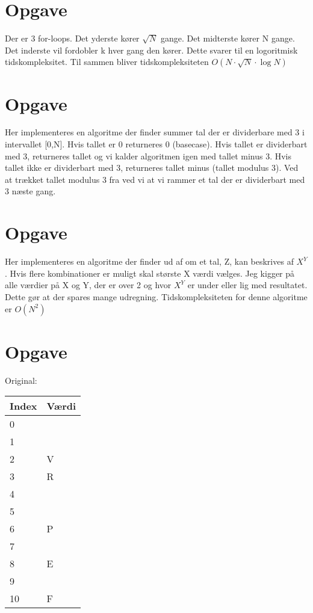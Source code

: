 \documentclass{article}
\begin{document}
\section{Opgave} %
Der er 3 for-loops. Det yderste kører $\sqrt{N}$ gange.
Det midterste kører N gange.
Det inderste vil fordobler k hver gang den kører. Dette svarer til
en logoritmisk tidskompleksitet.
Til sammen bliver tidskompleksiteten $O(N\cdot\sqrt{N}\cdot \log{N})$

\section{Opgave} %
Her implementeres en algoritme der finder summer tal der er dividerbare med 3
i intervallet [0,N].
Hvis tallet er 0 returneres 0 (basecase).
Hvis tallet er dividerbart med 3, returneres tallet og vi kalder algoritmen igen
med tallet minus 3. 
Hvis tallet ikke er dividerbart med 3, returneres tallet minus (tallet modulus 3).
Ved at trækket tallet modulus 3 fra ved vi at vi rammer et tal der er dividerbart
med 3 næste gang.

\section{Opgave} %
Her implementeres en algoritme der finder ud af om et tal, Z, kan beskrives af $X^Y$. 
Hvis flere kombinationer er muligt skal største X værdi vælges.
Jeg kigger på alle værdier på X og Y, der er over 2 og hvor $X^Y$ er under eller lig
med resultatet. Dette gør at der spares mange udregning. Tidskompleksiteten for 
denne algoritme er $O(N^2)$

\section{Opgave} %
Original:
\begin{table}[H]
\centering
\begin{tabular}{|l|l|}
\hline
\rowcolor[HTML]{C0C0C0} 
Index & Værdi \\ \hline
0     &       \\ \hline
1     &       \\ \hline
2     & V     \\ \hline
3     & R     \\ \hline
4     &       \\ \hline
5     &       \\ \hline
6     & P     \\ \hline
7     &       \\ \hline
8     & E     \\ \hline
9     &       \\ \hline
10    & F     \\ \hline
\end{tabular}
\end{table}
\end{document}
